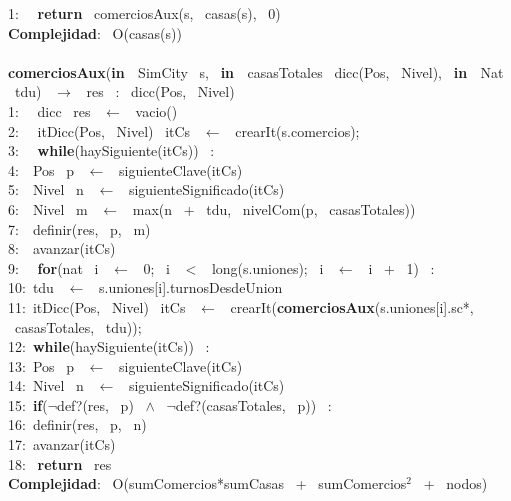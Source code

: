 1: \  \ \textbf{return} \ comerciosAux(s, \ casas(s), \ 0)\\
\textbf{Complejidad}: \ O(casas(s))\\
\\
\textbf{comerciosAux}(\textbf{in \ }SimCity \ s, \ \textbf{in \ }casasTotales \ dicc(Pos, \ Nivel), \ \textbf{in \ }Nat \ tdu) \ $\rightarrow $ \ res \ : \ dicc(Pos, \ Nivel)\\
1: \  \ dicc \ res \ $\leftarrow$ \ vacio()\\
2: \  \ itDicc(Pos, \ Nivel) \ itCs \ $\leftarrow$ \ crearIt(s.comercios);\\
3: \  \ \textbf{while}(haySiguiente(itCs)) \ :\\
4:\indent  \  \ Pos \ p \ $\leftarrow$ \ siguienteClave(itCs)\\
5:\indent  \  \ Nivel \ n \ $\leftarrow$ \ siguienteSignificado(itCs)\\
6:\indent  \  \ Nivel \ m \ $\leftarrow$ \ max(n \ + \ tdu, \ nivelCom(p, \ casasTotales))\\
7:\indent  \  \ definir(res, \ p, \ m)\\
8:\indent  \  \ avanzar(itCs)\\
9: \  \ \textbf{for}(nat \ i \ $\leftarrow$ \ 0; \ i \ $<$ \ long(s.uniones); \ i \ $\leftarrow$ \ i \ + \ 1) \ : \ \\
10:\indent  \ tdu \ $\leftarrow$ \ s.uniones[i].turnosDesdeUnion\\
11:\indent  \ itDicc(Pos, \ Nivel) \ itCs \ $\leftarrow$ \ crearIt(\textbf{comerciosAux}(s.uniones[i].sc*, \ casasTotales, \ tdu));\\
12:\indent  \ \textbf{while}(haySiguiente(itCs)) \ :\\
13:\indent \indent  \ Pos \ p \ $\leftarrow$ \ siguienteClave(itCs)\\
14:\indent \indent  \ Nivel \ n \ $\leftarrow$ \ siguienteSignificado(itCs)\\
15:\indent \indent  \ \textbf{if}($\neg$def?(res, \ p) \ $\wedge$ \ $\neg$def?(casasTotales, \ p)) \ :\\
16:\indent \indent \indent  \ definir(res, \ p, \ n)\\
17:\indent \indent  \ avanzar(itCs)\\
18: \ \textbf{return} \ res\\
\textbf{Complejidad}: \ O(sumComercios*sumCasas \ + \ sumComercios$^2$ \ + \ nodos)\\
\noindent\makebox[\linewidth]{\rule{\textwidth}{0.4pt}}
\\
